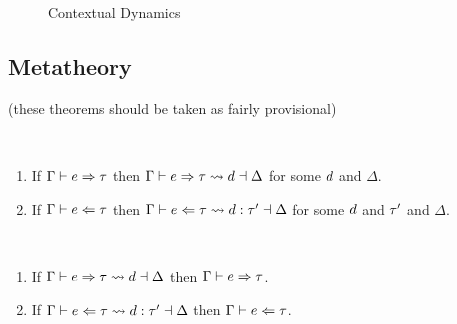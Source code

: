 \begin{figure}
\begin{mathpar}

\end{mathpar}

\begin{mathpar}
\end{mathpar}
\caption{Contextual Dynamics}
\label{fig:contextual-dynamics}
\end{figure}


\clearpage
\subsection{Metatheory}

(these theorems should be taken as fairly provisional)

\begin{theorem} ~
  \begin{enumerate}
    \item If $\hsyn{\hGamma}{\hexp}{\htau}$ then $\expandSyn{\hGamma}{\hexp}{\htau}{\dexp}{\Delta}$ for some $\dexp$ and $\Delta$.
    \item If $\hana{\hGamma}{\hexp}{\htau}$ then $\expandAna{\hGamma}{\hexp}{\htau}{\dexp}{\htau'}{\Delta}$ for some $\dexp$ and $\htau'$ and $\Delta$.
  \end{enumerate}
\end{theorem}

\begin{theorem} ~
  \begin{enumerate}
    \item If $\expandSyn{\hGamma}{\hexp}{\htau}{\dexp}{\Delta}$ then $\hsyn{\hGamma}{\hexp}{\htau}$.
    \item If $\expandAna{\hGamma}{\hexp}{\htau}{\dexp}{\htau'}{\Delta}$ then $\hana{\hGamma}{\hexp}{\htau}$.
  \end{enumerate}
\end{theorem}

